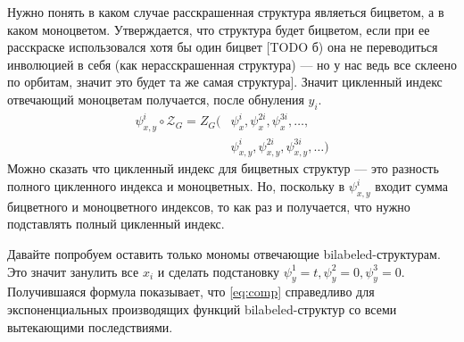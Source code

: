 Нужно понять в каком случае расскрашенная структура являеться бицветом, а в
каком моноцветом. Утверждается, что структура будет бицветом, если при ее
расскраске использовался хотя бы один бицвет [TODO б) она не переводиться
инволюцией в себя (как нерасскрашенная структура) --- но у нас ведь все
склеено по орбитам, значит это будет та же самая структура]. Значит цикленный
индекс отвечающий моноцветам получается, после обнуления $y_i$.
\begin{equation*}
\begin{split}
\psi_{x, y}^i \circ \mathcal Z_G = 
Z_G(&\psi_x^i, \psi_x^{2i}, \psi_x^{3i}, \dots,\\
	&\psi_{x,y}^i, \psi_{x,y}^{2i}, \psi_{x,y}^{3i}, \dots)
\end{split}
\end{equation*}
Можно сказать что цикленный индекс для бицветных структур --- это разность
полного цикленного индекса и моноцветных. Но, поскольку в $\psi_{x,y}^i$ входит
сумма бицветного и моноцветного индексов, то как раз и получается, что нужно
подставлять полный цикленный индекс.

Давайте попробуем оставить только мономы отвечающие bilabeled-структурам. Это
значит занулить все $x_i$ и сделать подстановку $\psi_y^1 = t, \psi_y^2 = 0,
\psi_y^3 = 0$. Получившаяся формула показывает, что \ref{eq:comp} справедливо
для экспоненциальных производящих функций bilabeled-структур со всеми
вытекающими последствиями.
